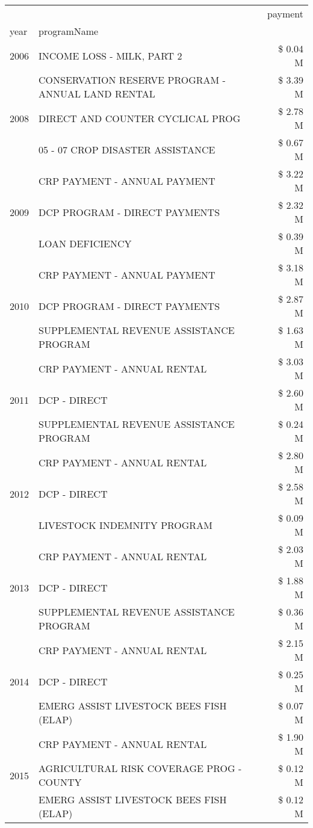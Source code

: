 \begin{tabular}{llr}
\toprule
 &  & payment \\
year & programName &  \\
\midrule
2006 & INCOME LOSS - MILK, PART 2 & \$ 0.04 M \\
\cline{1-3}
\multirow[t]{3}{*}{2008} & CONSERVATION RESERVE PROGRAM - ANNUAL LAND RENTAL & \$ 3.39 M \\
 & DIRECT AND COUNTER CYCLICAL PROG & \$ 2.78 M \\
 & 05 - 07 CROP DISASTER ASSISTANCE & \$ 0.67 M \\
\cline{1-3}
\multirow[t]{3}{*}{2009} & CRP PAYMENT - ANNUAL PAYMENT & \$ 3.22 M \\
 & DCP PROGRAM - DIRECT PAYMENTS & \$ 2.32 M \\
 & LOAN DEFICIENCY & \$ 0.39 M \\
\cline{1-3}
\multirow[t]{3}{*}{2010} & CRP PAYMENT - ANNUAL PAYMENT & \$ 3.18 M \\
 & DCP PROGRAM - DIRECT PAYMENTS & \$ 2.87 M \\
 & SUPPLEMENTAL REVENUE ASSISTANCE PROGRAM & \$ 1.63 M \\
\cline{1-3}
\multirow[t]{3}{*}{2011} & CRP PAYMENT - ANNUAL RENTAL & \$ 3.03 M \\
 & DCP - DIRECT & \$ 2.60 M \\
 & SUPPLEMENTAL REVENUE ASSISTANCE PROGRAM & \$ 0.24 M \\
\cline{1-3}
\multirow[t]{3}{*}{2012} & CRP PAYMENT - ANNUAL RENTAL & \$ 2.80 M \\
 & DCP - DIRECT & \$ 2.58 M \\
 & LIVESTOCK INDEMNITY PROGRAM & \$ 0.09 M \\
\cline{1-3}
\multirow[t]{3}{*}{2013} & CRP PAYMENT - ANNUAL RENTAL & \$ 2.03 M \\
 & DCP - DIRECT & \$ 1.88 M \\
 & SUPPLEMENTAL REVENUE ASSISTANCE PROGRAM & \$ 0.36 M \\
\cline{1-3}
\multirow[t]{3}{*}{2014} & CRP PAYMENT - ANNUAL RENTAL & \$ 2.15 M \\
 & DCP - DIRECT & \$ 0.25 M \\
 & EMERG ASSIST LIVESTOCK BEES FISH (ELAP) & \$ 0.07 M \\
\cline{1-3}
\multirow[t]{3}{*}{2015} & CRP PAYMENT - ANNUAL RENTAL & \$ 1.90 M \\
 & AGRICULTURAL RISK COVERAGE PROG - COUNTY & \$ 0.12 M \\
 & EMERG ASSIST LIVESTOCK BEES FISH (ELAP) & \$ 0.12 M \\

\end{tabular}
